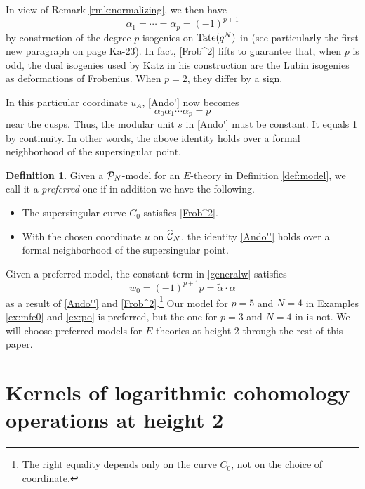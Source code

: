 \documentclass{gtpart}
\theoremstyle{definition}
\newtheorem{defn}[equation]{Definition}
\theoremstyle{remark}
\newcommand{\CC}{{\cal C}}
\newcommand{\CP}{{\cal P}}
\newcommand{\HCC}{\widehat{~\!\!\CC}}
\newcommand{\A}{\alpha}
\renewcommand{\=}{\approx}
\renewcommand{\-}{\sim}
\newcommand{\Tate}{{\rm Tate}}
\numberwithin{equation}{section}
\begin{document}
In view of Remark \ref{rmk:normalizing}, we then have 
\begin{equation}
 \label{Ai}
 \A_1 = \cdots = \A_p = (-1)^{p + 1} 
\end{equation}
by construction of the degree-$p$ isogenies on $\Tate(q^N)$ in 
\cite[Section 1.11]{padicprop} (see particularly the first new paragraph on page 
Ka-23).  In fact, \eqref{Frob^2} lifts to guarantee that, when $p$ is odd, the 
dual isogenies used by Katz in his construction are the Lubin isogenies as 
deformations of Frobenius.  When $p = 2$, they differ by a sign.  

In this particular coordinate $u_A$, \eqref{Ando'} now becomes 
\begin{equation}
 \label{Ando''}
 \A_0 \A_1 \cdots \A_p = p 
\end{equation}
near the cusps.  Thus, the modular unit $s$ in \eqref{Ando'} must be constant.  
It equals 1 by continuity.  In other words, the above identity holds over a 
formal neighborhood of the supersingular point.  

\begin{defn}
 \label{def:preferred}
 Given a $\CP_N$-model for an $E$-theory in Definition \ref{def:model}, we call 
 it a {\em preferred} one if in addition we have the following.  
 \begin{itemize}
  \item The supersingular curve $C_0$ satisfies \eqref{Frob^2}.  

  \item With the chosen coordinate $u$ on $\HCC_N$, the identity \eqref{Ando''} 
  holds over a formal neighborhood of the supersingular point.  
 \end{itemize}
\end{defn}

Given a preferred model, the constant term in \eqref{generalw} satisfies 
\begin{equation}
 \label{w0}
 w_0 = (-1)^{p + 1} p = \widetilde{\A} \cdot \A 
\end{equation}
as a result of \eqref{Ando''} and \eqref{Frob^2}.\footnote{The right equality 
depends only on the curve $C_0$, not on the choice of coordinate.  }  Our model 
for $p = 5$ and $N = 4$ in Examples \ref{ex:mfe0} and \ref{ex:po} is preferred, 
but the one for $p = 3$ and $N = 4$ in \cite{p3} is not.  We will choose 
preferred models for $E$-theories at height 2 through the rest of this paper.  



\section{Kernels of logarithmic cohomology operations at height 2}
\label{sec:kerlog}
\end{document}
